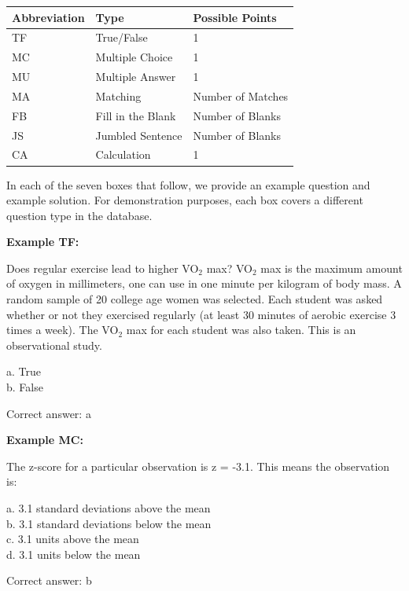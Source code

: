 \documentclass[11pt,a4paper,oldfontcommands,openany]{memoir}
\numberwithin{equation}{section} %
\begin{document}
\begin{center}
\label{tab:questionTypes}
\begin{tabular} { | l | l | l |}
\hline \textbf{Abbreviation} & \textbf{Type} & \textbf{Possible Points} \\
\hline
TF & True/False & 1 \\
\hline
MC & Multiple Choice & 1 \\
\hline
MU & Multiple Answer & 1 \\
\hline
MA & Matching & Number of Matches \\
\hline
FB & Fill in the Blank & Number of Blanks \\
\hline
JS & Jumbled Sentence & Number of Blanks \\
\hline
CA & Calculation & 1 \\
\hline
\end{tabular}
\end{center}

In each of the seven boxes that follow, we provide an example question and example solution. For demonstration purposes, each box covers a different question type in the database. \\

\begin{framed}
\textbf{Example TF:}

Does regular exercise lead to higher VO$_2$ max? VO$_2$ max is the maximum amount of oxygen in millimeters, one can use in one minute per kilogram of body mass. A random sample of 20 college age women was selected. Each student was asked whether or not they exercised regularly (at least 30 minutes of aerobic exercise 3 times a week). The VO$_2$ max for each student was also taken. This is an observational study.

a. True\\
b. False

Correct answer: a
\end{framed}

\begin{framed}
\textbf{Example MC:}

The z-score for a particular observation is z = -3.1. This means the observation is:

a. 3.1 standard deviations above the mean\\
b. 3.1 standard deviations below the mean\\
c. 3.1 units above the mean\\
d. 3.1 units below the mean

Correct answer: b
\end{framed}
\end{document}
